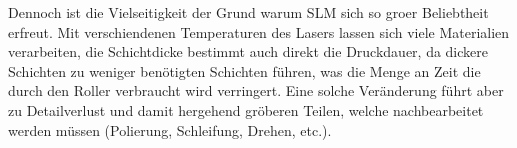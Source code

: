 \documentclass[main.tex]{subfiles}
\begin{document}
Dennoch ist die Vielseitigkeit der Grund warum SLM sich so groer Beliebtheit erfreut. Mit verschiendenen Temperaturen des Lasers lassen sich viele Materialien verarbeiten, die Schichtdicke bestimmt auch direkt die Druckdauer, da dickere Schichten zu weniger benötigten Schichten führen, was die Menge an Zeit die durch den Roller verbraucht wird verringert.
Eine solche Veränderung führt aber zu Detailverlust und damit hergehend gröberen Teilen, welche nachbearbeitet werden müssen (Polierung, Schleifung, Drehen, etc.). 
\end{document}

